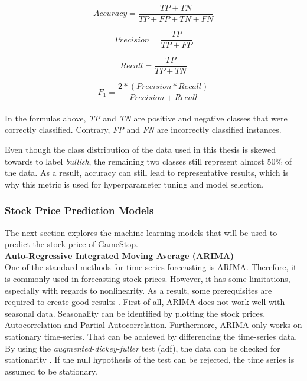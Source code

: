 \documentclass[11pt, a4paper]{article}
\begin{document}
\begin{equation*}
    Accuracy = \frac{TP+TN}{TP+FP+TN+FN}
\end{equation*}

\begin{equation*}
    Precision = \frac{TP}{TP+FP}
\end{equation*}

\begin{equation*}
    Recall = \frac{TP}{TP+TN}
\end{equation*}

\begin{equation*}
    F_{1}=\frac{2*(Precision * Recall)}{Precision + Recall}
\end{equation*}
\\
\noindent In the formulas above, \emph{TP} and \emph{TN} are positive and negative classes that were correctly classified. Contrary, \emph{FP} and \emph{FN} are
incorrectly classified instances.

Even though the class distribution of the data used in this thesis is skewed towards to label \emph{bullish}, the remaining two classes still represent
almost 50\% of the data. As a result, accuracy can still lead to representative results, which is why this metric is used for hyperparameter tuning and model selection.

\subsubsection{Stock Price Prediction Models}
The next section explores the machine learning models that will be used to predict the stock price of GameStop. \\

\noindent\textbf{Auto-Regressive Integrated Moving Average (ARIMA)}\\
One of the standard methods for time series forecasting is ARIMA. Therefore, it is commonly used in forecasting stock prices.
However, it has some limitations, especially with regards to nonlinearity.
As a result, some prerequisites are required to create good results \citep{sima2018timeseries}.
First of all, ARIMA does not work well with seasonal data. Seasonality can be identified by plotting the stock prices, Autocorrelation and Partial Autocorrelation.
Furthermore, ARIMA only works on stationary time-series. 
That can be achieved by differencing the time-series data. By using the \emph{augmented-dickey-fuller} test (adf),
the data can be checked for stationarity \citep{jain2017ASO}.
If the null hypothesis of the test can be rejected, the time series is assumed to be stationary. \\
\end{document}
